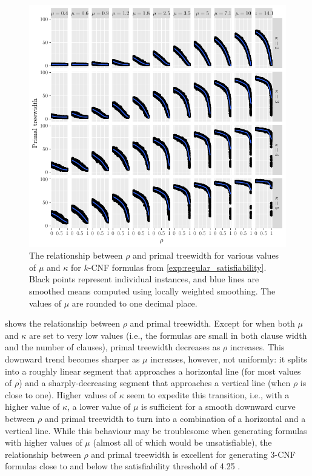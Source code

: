 \begin{figure}[t]
  \centering
  \includegraphics{chapters/comparison/regular_repetitiveness.pdf}
  \caption{The relationship between $\rho$ and primal treewidth for various
    values of $\mu$ and $\kappa$ for $k$-CNF formulas from
    \cref{exp:regular_satisfiability}. Black points represent individual
    instances, and blue lines are smoothed means computed using locally weighted
    smoothing. The values of $\mu$ are rounded to one decimal
    place.}\label{fig:regular_repetitiveness}
\end{figure}

 shows the relationship between $\rho$ and
primal treewidth. Except for when both $\mu$ and $\kappa$ are set to very low
values (i.e., the formulas are small in both clause width and the number of
clauses), primal treewidth decreases as $\rho$ increases. This downward trend
becomes sharper as $\mu$ increases, however, not uniformly: it splits into a
roughly linear segment that approaches a horizontal line (for most values of
$\rho$) and a sharply-decreasing segment that approaches a vertical line (when
$\rho$ is close to one). Higher values of $\kappa$ seem to expedite this
transition, i.e., with a higher value of $\kappa$, a lower value of $\mu$ is
sufficient for a smooth downward curve between $\rho$ and primal treewidth to
turn into a combination of a horizontal and a vertical line. While this
behaviour may be troublesome when generating formulas with higher values of
$\mu$ (almost all of which would be unsatisfiable), the relationship between
$\rho$ and primal treewidth is excellent for generating 3-CNF formulas close to
and below the satisfiability threshold of
4.25 \citep{DBLP:journals/ai/CrawfordA96}.

